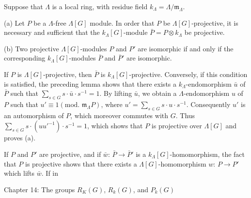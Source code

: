 Suppose that $\Lambda$ is a local ring, with residue field $k_{\Lambda} = \Lambda/\mathfrak{m}_{\Lambda}$.

(a) Let $P$ be a $\Lambda$-free $\Lambda[G]$ module. In order that $P$ be $\Lambda[G]$-projective, it is necessary and sufficient that the $k_{\Lambda}[G]$-module $\bar{P} = P \otimes k_{\Lambda}$ be projective.

(b) Two projective $\Lambda[G]$-modules $P$ and $P'$ are isomorphic if and only if the corresponding $k_{\Lambda}[G]$-modules $\bar{P}$ and $\bar{P}'$ are isomorphic.

If $P$ is $\Lambda[G]$-projective, then $\bar{P}$ is $k_{\Lambda}[G]$-projective. Conversely, if this condition is satisfied, the preceding lemma shows that there exists a $k_{\Lambda}$-endomorphism $\bar{u}$ of $\bar{P}$ such that $\sum_{s \in G} s \cdot \bar{u} \cdot s^{-1} = 1$. By lifting $\bar{u}$, we obtain a $\Lambda$-endomorphism $u$ of $P$ such that $u' \equiv 1 (\text{mod. } \mathfrak{m}_{\Lambda} P)$, where $u' = \sum_{s \in G} s \cdot u \cdot s^{-1}$. Consequently $u'$ is an automorphism of $P$, which moreover commutes with $G$. Thus $\sum_{s \in G} s \cdot (uu'^{-1}) \cdot s^{-1} = 1$, which shows that $P$ is projective over $\Lambda[G]$ and proves (a).

If $P$ and $P'$ are projective, and if $\bar{w}$: $\bar{P} \rightarrow \bar{P}'$ is a $k_{\Lambda}[G]$-homomorphism, the fact that $P$ is projective shows that there exists a $\Lambda[G]$-homomorphism $w$: $P \rightarrow P'$ which lifts $\bar{w}$. If in

Chapter 14: The groups $R_K(G)$, $R_k(G)$, and $P_k(G)$
